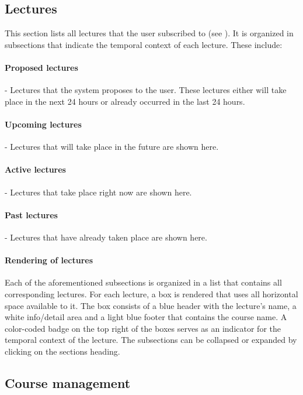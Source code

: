 \subsection{Lectures}
\label{section:soa:mainview:lectures}
This section lists all lectures that the user subscribed to (see ). It is organized in subsections that indicate the temporal context of each lecture. These include:

\paragraph{Proposed lectures} - Lectures that the system proposes to the user. These lectures either will take place in the next 24 hours or already occurred in the last 24 hours.
\paragraph{Upcoming lectures} - Lectures that will take place in the future are shown here.
\paragraph{Active lectures} - Lectures that take place right now are shown here.
\paragraph{Past lectures} - Lectures that have already taken place are shown here.

\paragraph{Rendering of lectures}

Each of the aforementioned subsections is organized in a list that contains all corresponding lectures. For each lecture, a box is rendered that uses all horizontal space available to it. The box consists of a blue header with the lecture's name, a white info/detail area and a light blue footer that contains the course name.
A color-coded badge on the top right of the boxes serves as an indicator for the temporal context of the lecture.
The subsections can be collapsed or expanded by clicking on the sections heading.



\subsection{Course management}

